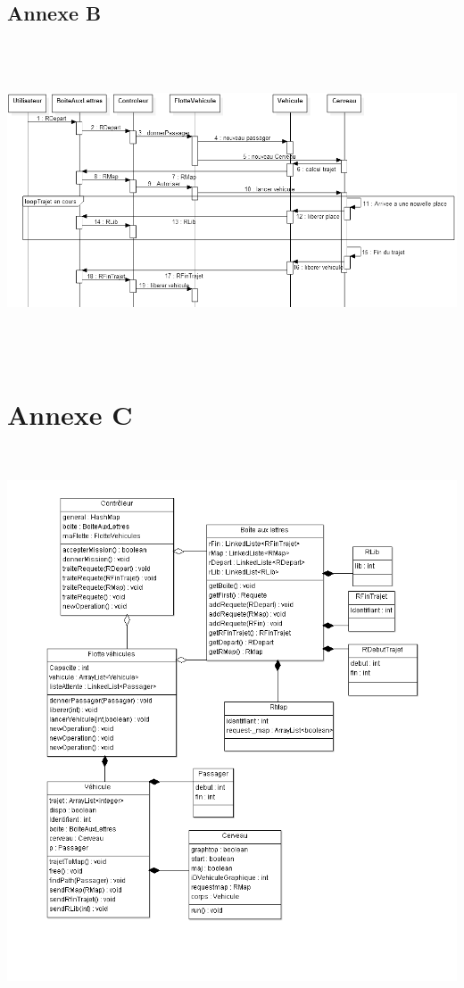 \documentclass[a4paper, titlepage]{report}
\begin{document}
\begin{landscape}
\vspace{-5cm}
\chapter*{Annexe B}
\includegraphics[width=745px, height=354px]{Images/SequenceDiagram1.png}
\end{landscape}
\setcounter{page}{19}
\chapter*{Annexe C}
\hspace{-2cm}\includegraphics[width=569px, height=632px]{Images/Diagrammedeclasses.png}
\end{document}
